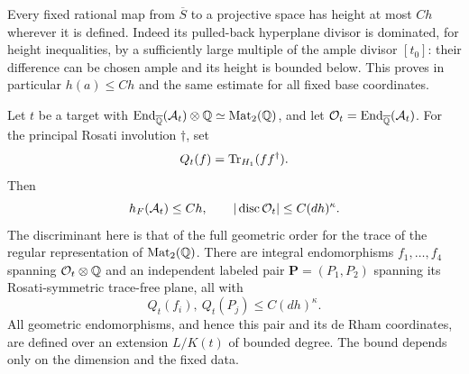 Every fixed rational map from $\overline S$ to a projective space has
height at most $Ch$ wherever it is defined. Indeed its pulled-back
hyperplane divisor is dominated, for height inequalities, by a sufficiently
large multiple of the ample divisor $[t_0]$: their difference can be
chosen ample and its height is bounded below. This proves in particular
$h(a)\leq Ch$ and the same estimate for all fixed base coordinates.

\begin{proposition}\label{ht:endomorphisms}
Let $t$ be a target with
$\operatorname{End}_{\overline{\mathbb Q}}(\mathcal A_t)\otimes\mathbb Q\simeq\operatorname{Mat}_2(\mathbb Q)$, and let
$\mathcal O_t=\operatorname{End}_{\overline{\mathbb Q}}(\mathcal A_t)$. For the principal Rosati involution
$\dagger$, set
\[
 Q_t(f)=\operatorname{Tr}_{H_1}(ff^\dagger).
\]
Then
\begin{equation}\label{ht:small-bounds}
 h_F(\mathcal A_t)\leq Ch,\qquad
 |\operatorname{disc}\mathcal O_t|\leq C(dh)^\kappa.
\end{equation}
The discriminant here is that of the full geometric order for the trace
of the regular representation of $\operatorname{Mat}_2(\mathbb Q)$.
There are integral endomorphisms $f_1,\ldots,f_4$ spanning
$\mathcal O_t\otimes\mathbb Q$ and an independent labeled pair
$\mathbf P=(P_1,P_2)$ spanning its Rosati-symmetric trace-free plane,
all with
\begin{equation}\label{ht:rosati-small}
 Q_t(f_i),\ Q_t(P_j)\leq C(dh)^\kappa.
\end{equation}
All geometric endomorphisms, and hence this pair and its de Rham
coordinates, are defined over an extension $L/K(t)$ of bounded degree.
The bound depends only on the dimension and the fixed data.
\end{proposition}

